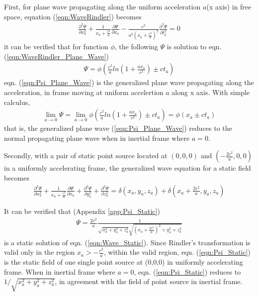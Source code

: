 \documentclass[prd,showpacs,preprint]{revtex4}
\begin{document}
First, for plane wave propagating along the uniform acceleration $a$(x axis) in free space, equation (\ref{eqn:WaveRindler}) becomes
\begin{eqnarray}
\frac{\partial^2 \Psi}{\partial x_a^2} + \frac{1}{x_a+\frac{c^2}{a}}\frac{\partial \Psi}{\partial x_a} - \frac{c^2}{a^2(x_a+\frac{c^2}{a})^2}\frac{\partial^2 \Psi}{\partial t_a^2}=0
\label{eqn:WaveRindler_Plane_Wave}
\end{eqnarray}
it can be verified that for function $\phi$, the following $\Psi$ is solution to eqn. (\ref{eqn:WaveRindler_Plane_Wave})
\begin{eqnarray}
\Psi=\phi(\frac{c^2}{a}ln(1+\frac{ax_a}{c^2}) \pm ct_a)
\label{eqn:Psi_Plane_Wave}
\end{eqnarray}
eqn. (\ref{eqn:Psi_Plane_Wave}) is the generalized plane wave propagating along the acceleration, in frame moving at uniform accelertion $a$ along x axis. With simple calculus,
\begin{eqnarray}
\lim_{a\to 0}\Psi=\lim_{a\to 0}\phi(\frac{c^2}{a}ln(1+\frac{ax_a}{c^2}) \pm ct_a)=\phi(x_a\pm ct_a)
\label{eqn:Psi_Plane_Wave_Inertial}
\end{eqnarray}
that is, the generalized plane wave (\ref{eqn:Psi_Plane_Wave}) reduces to the normal propagating plane wave when in inertial frame where $a=0$.

Secondly, with a pair of static point source located at $(0,0,0)$ and $(-\frac{2c^2}{a},0,0)$ in a uniformly accelerating frame, the generalized wave equation for a static field becomes
\begin{eqnarray}
\frac{\partial^2 \Psi}{\partial x_a^2} + \frac{1}{x_a+\frac{c^2}{a}}\frac{\partial \Psi}{\partial x_a} + \frac{\partial^2 \Psi}{\partial y_a^2} + \frac{\partial^2 \Psi}{\partial z_a^2} =\delta(x_a,y_a,z_a)+\delta(x_a+\frac{2c^2}{a},y_a,z_a)
\label{eqn:Wave_Static}
\end{eqnarray}

It can be verified that (Appendix \ref{app:Psi_Static})
\begin{eqnarray}
\Psi= \frac{2c^2}{a}\frac{1}{\sqrt{x_a^2+y_a^2+z_a^2}\sqrt{(x_a+\frac{2c^2}{a})^2+y_a^2+z_a^2}}
\label{eqn:Psi_Static}
\end{eqnarray}
is a static solution of eqn. (\ref{eqn:Wave_Static}). Since Rindler's transformation is valid only in the region $x_a>-\frac{c^2}{a}$, within the valid region, eqn. (\ref{eqn:Psi_Static}) is the static field of one single point source at (0,0,0) in uniformly accelerating frame. When in inertial frame where $a=0$, eqn. (\ref{eqn:Psi_Static}) reduces to $1/\sqrt{x_a^2+y_a^2+z_a^2}$, in agreement with the field of point source in inertial frame.
\end{document}
